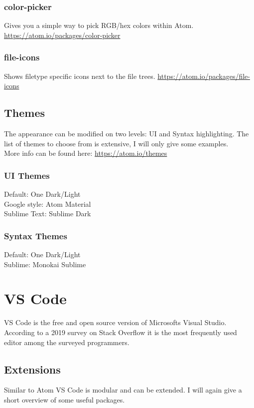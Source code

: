 \documentclass[10pt,a4paper]{article}
\begin{document}
\subsubsection{color-picker}
Gives you a simple way to pick RGB/hex colors within Atom. \url{https://atom.io/packages/color-picker}

\subsubsection{file-icons}
Shows filetype specific icons next to the file trees. \url{https://atom.io/packages/file-icons}


\subsection{Themes}
The appearance can be modified on two levels: UI and Syntax highlighting. The list of themes to choose from is extensive, I will only give some examples.\\
More info can be found here: \url{https://atom.io/themes}

\subsubsection{UI Themes}
Default: One Dark/Light\\
Google style: Atom Material\\
Sublime Text: Sublime Dark

\subsubsection{Syntax Themes}
Default: One Dark/Light\\
Sublime: Monokai Sublime\\

\section{VS Code}

VS Code is the free and open source version of Microsofts Visual Studio. According to a 2019 survey on Stack Overflow it is the most frequently used editor among the surveyed programmers.

\subsection{Extensions}

Similar to Atom VS Code is modular and can be extended. I will again give a short overview of some useful packages.
\end{document}
